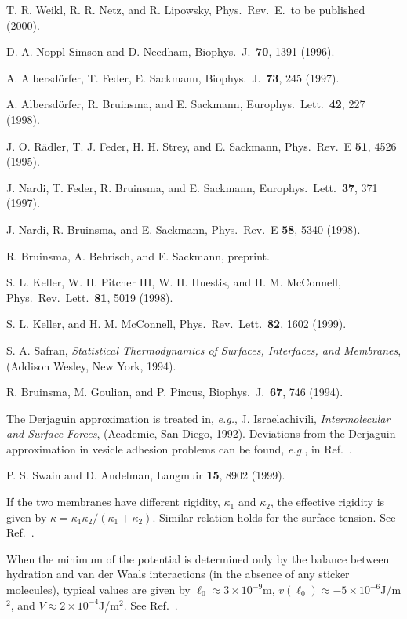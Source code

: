 \begin{references}
T. R. Weikl, R. R. Netz, and R. Lipowsky,
Phys.\ Rev.\ E.\, to be published (2000).

D. A. Noppl-Simson and D. Needham,
Biophys.\ J.\ {\bf 70}, 1391 (1996).

A. Albersd\"orfer, T. Feder, E. Sackmann,
Biophys.\ J.\ {\bf 73}, 245 (1997).

A. Albersd\"orfer, R. Bruinsma, and E. Sackmann,
Europhys.\ Lett.\ {\bf 42}, 227 (1998).

J. O. R\"adler, T. J. Feder, H. H. Strey, and E. Sackmann,
Phys.\ Rev.\ E {\bf 51}, 4526 (1995).

J. Nardi, T. Feder, R. Bruinsma, and E. Sackmann,
Europhys.\ Lett.\ {\bf 37}, 371 (1997).

J. Nardi, R. Bruinsma, and E. Sackmann,
Phys.\ Rev.\ E {\bf 58}, 5340 (1998).

R. Bruinsma, A. Behrisch, and E. Sackmann,
preprint.

S. L. Keller, W. H. Pitcher III, W. H. Huestis, and H. M. McConnell,
Phys.\ Rev.\ Lett.\ {\bf 81}, 5019 (1998).

S. L. Keller, and H. M. McConnell,
Phys.\ Rev.\ Lett.\ {\bf 82}, 1602 (1999).

S. A. Safran,
{\it Statistical Thermodynamics of Surfaces, Interfaces,
and Membranes},
(Addison Wesley, New York, 1994).

R. Bruinsma, M. Goulian, and P. Pincus,
Biophys.\ J.\ {\bf 67}, 746 (1994).

The Derjaguin approximation is treated in, {\it e.g.},
J. Israelachivili,
{\it Intermolecular and Surface Forces},
(Academic, San Diego, 1992).
Deviations from the Derjaguin approximation
in vesicle adhesion problems can be found,
{\it e.g.}, in Ref.\ \cite{SA}.

P. S. Swain and D. Andelman,
Langmuir {\bf 15}, 8902 (1999).

If the two membranes have different rigidity,
$\kappa_1$ and $\kappa_2$, the effective rigidity
is given by
$\kappa = \kappa_1 \kappa_2/(\kappa_1 + \kappa_2)$.
Similar relation holds for the surface tension.
See Ref.\ \cite{Lipowsky96}.

When the minimum of the potential is determined only by
the balance between hydration and van der Waals interactions
(in the absence of any sticker molecules),
typical values are given by
$\ell_0 \approx 3 \times 10^{-9}$m,
$v(\ell_0) \approx -5 \times 10^{-6}$J/m$^{2}$, and
$V \approx 2 \times 10^{-4}$J/m$^{2}$.
See Ref.\ \cite{SA}.


\end{references}
